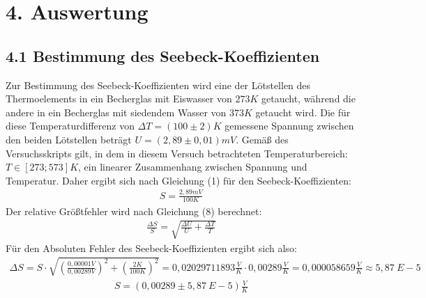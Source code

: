 \documentclass[a4paper]{article}
\begin{document}
\section*{4. Auswertung}
\subsection*{4.1 Bestimmung des Seebeck-Koeffizienten}
Zur Bestimmung des Seebeck-Koeffizienten wird eine der Lötstellen des Thermoelements in ein Becherglas mit Eiswasser von $273K$ getaucht, während die andere in ein Becherglas mit siedendem Wasser von $373K$ getaucht wird. Die für diese Temperaturdifferenz von $\Delta T=(100\pm 2)K$ gemessene Spannung zwischen den beiden Lötstellen beträgt $U=(2,89\pm 0,01)mV$. Gemäß des Versuchsskripts gilt, in dem in diesem Versuch betrachteten Temperaturbereich: $T\in [273;573]K$, ein linearer Zusammenhang zwischen Spannung und Temperatur. Daher ergibt sich nach Gleichung (1) für den Seebeck-Koeffizienten:
\begin{align}
S=\frac{2,89mV}{100K}
\end{align}
Der relative Größtfehler wird nach Gleichung (8) berechnet:
\begin{align}
\frac{\Delta S}{S}=\sqrt{\frac{\Delta U}{U}+\frac{\Delta T}{T}}
\end{align}
Für den Absoluten Fehler des Seebeck-Koeffizienten ergibt sich also:
\begin{align}
\Delta S=S\cdot \sqrt{\left(\frac{0,00001V}{0,00289V}\right)^2+\left(\frac{2K}{100K}\right)^2}=0,02029711893\frac{V}{K}\cdot 0,00289\frac{V}{K}=0,000058659\frac{V}{K}\approx 5,87\ E-5
\end{align}
\begin{align}
S=(0,00289\pm 5,87\ E-5)\frac{V}{K}
\end{align}
\end{document}
